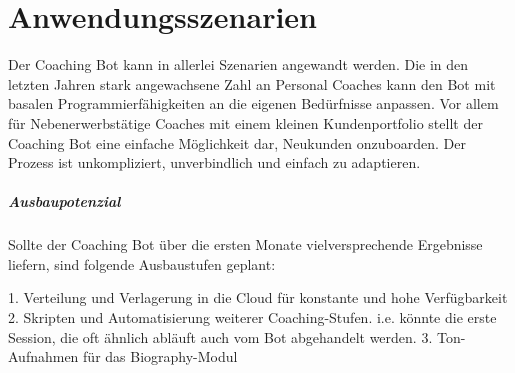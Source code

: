 \chapter{Anwendungsszenarien}

Der Coaching Bot kann in allerlei Szenarien angewandt werden. Die in den letzten Jahren stark angewachsene Zahl an Personal Coaches kann den Bot mit basalen Programmierfähigkeiten an die eigenen Bedürfnisse anpassen. Vor allem für Nebenerwerbstätige Coaches mit einem kleinen Kundenportfolio stellt der Coaching Bot eine einfache Möglichkeit dar, Neukunden onzuboarden. Der Prozess ist unkompliziert, unverbindlich und einfach zu adaptieren. 

\paragraph{Ausbaupotenzial}
Sollte der Coaching Bot über die ersten Monate vielversprechende Ergebnisse liefern, sind folgende Ausbaustufen geplant:

1. Verteilung und Verlagerung in die Cloud für konstante und hohe Verfügbarkeit
2. Skripten und Automatisierung weiterer Coaching-Stufen. i.e. könnte die erste Session, die oft ähnlich abläuft auch vom Bot abgehandelt werden.
3. Ton-Aufnahmen für das Biography-Modul

